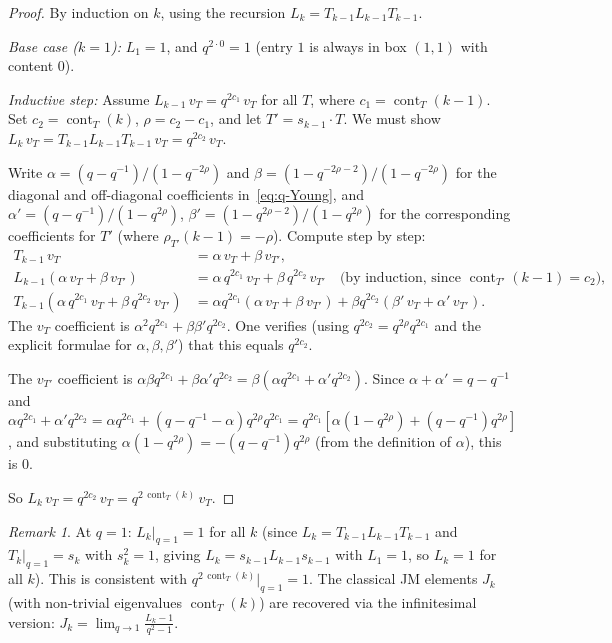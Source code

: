 \documentclass[12pt,a4paper]{article}
\theoremstyle{definition}
\theoremstyle{remark}
\newtheorem{remark}[theorem]{Remark}
\newcommand{\cont}{\operatorname{cont}}
\begin{document}
\begin{proof}
By induction on $k$, using the recursion
$L_k = T_{k-1} L_{k-1} T_{k-1}$.

\emph{Base case ($k = 1$):} $L_1 = 1$, and $q^{2 \cdot 0} = 1$
(entry $1$ is always in box $(1,1)$ with content $0$).

\emph{Inductive step:} Assume $L_{k-1}\, v_T = q^{2 c_1}\, v_T$
for all $T$, where $c_1 = \cont_T(k{-}1)$. Set $c_2 = \cont_T(k)$,
$\rho = c_2 - c_1$, and let $T' = s_{k-1} \cdot T$. We must show
$L_k\, v_T = T_{k-1} L_{k-1} T_{k-1}\, v_T = q^{2 c_2}\, v_T$.

Write $\alpha = (q - q^{-1})/(1 - q^{-2\rho})$ and
$\beta = (1 - q^{-2\rho-2})/(1 - q^{-2\rho})$ for the diagonal and
off-diagonal coefficients in~\eqref{eq:q-Young}, and $\alpha' =
(q - q^{-1})/(1 - q^{2\rho})$, $\beta' = (1 - q^{2\rho-2})/(1 -
q^{2\rho})$ for the corresponding coefficients for $T'$ (where
$\rho_{T'}(k{-}1) = -\rho$). Compute step by step:
\begin{align*}
  T_{k-1}\, v_T &= \alpha\, v_T + \beta\, v_{T'}, \\
  L_{k-1}(\alpha\, v_T + \beta\, v_{T'})
    &= \alpha\, q^{2c_1}\, v_T + \beta\, q^{2c_2}\, v_{T'}
    \quad\text{(by induction, since $\cont_{T'}(k{-}1) = c_2$)}, \\
  T_{k-1}(\alpha\, q^{2c_1}\, v_T + \beta\, q^{2c_2}\, v_{T'})
    &= \alpha q^{2c_1}(\alpha\, v_T + \beta\, v_{T'})
    + \beta q^{2c_2}(\beta'\, v_T + \alpha'\, v_{T'}).
\end{align*}
The $v_T$ coefficient is
$\alpha^2 q^{2c_1} + \beta \beta' q^{2c_2}$.
One verifies (using $q^{2c_2} = q^{2\rho} q^{2c_1}$ and the
explicit formulae for $\alpha, \beta, \beta'$) that this equals
$q^{2c_2}$.

The $v_{T'}$ coefficient is
$\alpha \beta q^{2c_1} + \beta \alpha' q^{2c_2}
= \beta(\alpha q^{2c_1} + \alpha' q^{2c_2})$.
Since $\alpha + \alpha' = q - q^{-1}$ and
$\alpha q^{2c_1} + \alpha' q^{2c_2}
= \alpha q^{2c_1} + (q - q^{-1} - \alpha) q^{2\rho} q^{2c_1}
= q^{2c_1}[\alpha(1 - q^{2\rho}) + (q-q^{-1})q^{2\rho}]$,
and substituting $\alpha(1 - q^{2\rho}) = -(q-q^{-1})q^{2\rho}$
(from the definition of $\alpha$), this is $0$.

So $L_k\, v_T = q^{2c_2}\, v_T = q^{2\,\cont_T(k)}\, v_T$.
\end{proof}

\begin{remark}
At $q = 1$: $L_k|_{q=1} = 1$ for all $k$ (since $L_k = T_{k-1}
L_{k-1} T_{k-1}$ and $T_k|_{q=1} = s_k$ with $s_k^2 = 1$, giving
$L_k = s_{k-1} L_{k-1} s_{k-1}$ with $L_1 = 1$, so $L_k = 1$ for
all $k$). This is consistent with $q^{2\,\cont_T(k)}|_{q=1} = 1$.
The classical JM elements $J_k$ (with non-trivial eigenvalues
$\cont_T(k)$) are recovered via the infinitesimal version:
$J_k = \lim_{q \to 1} \frac{L_k - 1}{q^2 - 1}$.
\end{remark}
\end{document}
